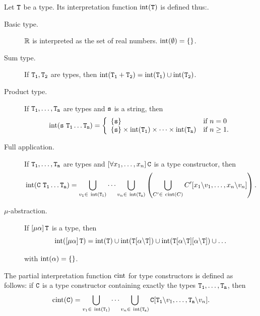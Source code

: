 \begin{definition}\label{def:typeSem}
	Let $\mathtt{T}$ be a type. Its interpretation function $\operatorname{int}(\mathtt{T})$ is defined thus:.
	\begin{description}
		\item[Basic type.] $\mathbb{R}$ is interpreted as the set of real numbers. $\operatorname{int}(\emptyset) = \{\}$.
		\item[Sum type.] If $\mathtt{T_1}, \mathtt{T_2}$ are types, then $\operatorname{int}(\mathtt{T_1 + T_2}) = \operatorname{int}(\mathtt{T_1}) \cup \operatorname{int}(\mathtt{T_2})$.
		\item[Product type.] If $\mathtt{T_1},\dots,\mathtt{T_n}$ are types and $\mathtt{s}$ is a string, then
		$$
		\operatorname{int}(\mathtt{s}\ \mathtt{T_1} \dots \mathtt{T_n}) = \left\{
		\begin{array}{l l}
		\{\mathtt{s}\} & \textnormal{if } n = 0\\
		\{\mathtt{s}\} \times \operatorname{int}(\mathtt{T_1}) \times \dots \times \operatorname{int}(\mathtt{T_n}) & \textnormal{if } n \geq 1.
		\end{array}
		\right.
		$$
		
		\item[Full application.] If $\mathtt{T_1},\dots,\mathtt{T_n}$ are types and $\left[\forall x_1,\dots,x_n \right] \mathtt{C}$ is a type constructor, then
		$$
		\operatorname{int}(\mathtt{C}\ \mathtt{T_1} \dots \mathtt{T_n}) = \bigcup\limits_{v_1 \in\ \operatorname{int}(\mathtt{T_1})} \cdots \bigcup\limits_{v_n \in\ \operatorname{int}(\mathtt{T_n})} \left( \bigcup\limits_{C' \in\ \operatorname{cint}(C)} C'[x_1\backslash v_1,\dots, x_n\backslash v_n] \right).
		$$
		
		\item[$\mu$-abstraction.] If $\left[\mu \alpha \right]\mathtt{T}$ is a type, then $$\operatorname{int}(\left[\mu \alpha \right]\mathtt{T}) = \operatorname{int}(\mathtt{T}) \cup \operatorname{int}(\mathtt{T}[\alpha\backslash\mathtt{T}]) \cup \operatorname{int}(\mathtt{T}[\alpha\backslash\mathtt{T}][\alpha\backslash\mathtt{T}]) \cup \dots$$
		
		with $\operatorname{int}(\alpha) = \{\}$.
	\end{description}
\end{definition}

\begin{definition}\label{def:typeConSem}
	The partial interpretation function $\operatorname{cint}$ for type constructors is defined as follows: if $\mathtt{C}$ is a type constructor containing exactly the types $\mathtt{T_1},\dots,\mathtt{T_n}$, then
	$$
	\cint(\type{C}) = \bigcup\limits_{v_1 \in\ \tint(\type{T_1})} \cdots \bigcup\limits_{v_n \in\ \tint(\type{T_n})} \type{C}[\type{T_1}\backslash v_1,\dots,\type{T_n}\backslash v_n].
	$$
\end{definition}

